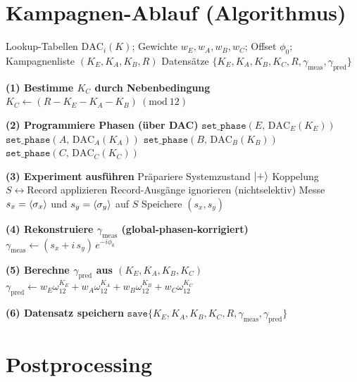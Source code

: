 \documentclass[11pt,a4paper]{article}
\newcommand{\modtwelve}{\ (\mathrm{mod}\ 12)}
\newcommand{\omegaT}{\omega_{12}}
\begin{document}
	\section{Kampagnen-Ablauf (Algorithmus)}
	
	\begin{algorithm}[h]
		\caption{Phasenprogrammierung (mod 12), Experiment, Rekonstruktion von $\gamma$}
		\begin{algorithmic}[1]
			\Require Lookup-Tabellen $\mathrm{DAC}_i(K)$; Gewichte $w_E,w_A,w_B,w_C$; Offset $\phi_0$; Kampagnenliste $(K_E,K_A,K_B,R)$
			\Ensure Datensätze $\{K_E,K_A,K_B,K_C,R,\gamma_{\mathrm{meas}},\gamma_{\mathrm{pred}}\}$
			
			\State \textbf{(1) Bestimme $K_C$ durch Nebenbedingung}
			\State $K_C \gets (R - K_E - K_A - K_B)\modtwelve$
			\Statex
			
			\State \textbf{(2) Programmiere Phasen (über DAC)}
			\State $\texttt{set\_phase}(E,\,\mathrm{DAC}_E(K_E))$
			\State $\texttt{set\_phase}(A,\,\mathrm{DAC}_A(K_A))$
			\State $\texttt{set\_phase}(B,\,\mathrm{DAC}_B(K_B))$
			\State $\texttt{set\_phase}(C,\,\mathrm{DAC}_C(K_C))$
			\Statex
			
			\State \textbf{(3) Experiment ausführen}
			\State Präpariere Systemzustand $\ket{+}$
			\State Koppelung $S \leftrightarrow \text{Record}$ applizieren
			\State Record-Ausgänge ignorieren (nichtselektiv)
			\State Messe $s_x=\expval{\sigma_x}$ und $s_y=\expval{\sigma_y}$ auf $S$
			\State Speichere $(s_x,s_y)$
			\Statex
			
			\State \textbf{(4) Rekonstruiere $\gamma_{\mathrm{meas}}$ (global-phasen-korrigiert)}
			\State $\gamma_{\mathrm{meas}} \gets (s_x + i\,s_y)\,e^{-i\phi_0}$
			\Statex
			
			\State \textbf{(5) Berechne $\gamma_{\mathrm{pred}}$ aus $(K_E,K_A,K_B,K_C)$}
			\State $\gamma_{\mathrm{pred}} \gets w_E\omegaT^{K_E} + w_A\omegaT^{K_A} + w_B\omegaT^{K_B} + w_C\omegaT^{K_C}$
			\Statex
			
			\State \textbf{(6) Datensatz speichern}
			\State $\texttt{save}\{K_E,K_A,K_B,K_C,R,\gamma_{\mathrm{meas}},\gamma_{\mathrm{pred}}\}$
			\EndFor
		\end{algorithmic}
	\end{algorithm}
	
	\section{Postprocessing}
	
\end{document}
